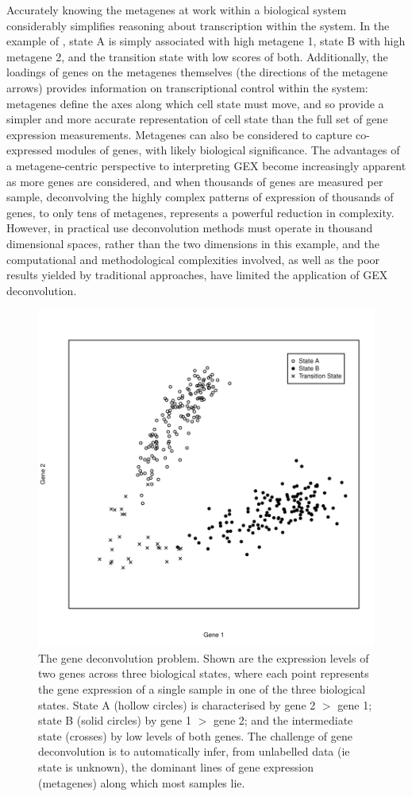 \documentclass[dissertation.tex]{subfiles}
\begin{document}
Accurately knowing the metagenes at work within a biological system considerably simplifies reasoning about transcription within the system.  In the example of , state A is simply associated with high metagene 1, state B with high metagene 2, and the transition state with low scores of both.  Additionally, the loadings of genes on the metagenes themselves (the directions of the metagene arrows) provides information on transcriptional control within the system: metagenes define the axes along which cell state must move, and so provide a simpler and more accurate representation of cell state than the full set of gene expression measurements.  Metagenes can also be considered to capture co-expressed modules of genes, with likely biological significance.  The advantages of a metagene-centric perspective to interpreting \gls{GEX} become increasingly apparent as more genes are considered, and when thousands of genes are measured per sample, deconvolving the highly complex patterns of expression of thousands of genes, to only tens of metagenes, represents a powerful reduction in complexity.  However, in practical use deconvolution methods must operate in thousand dimensional spaces, rather than the two dimensions in this example, and the computational and methodological complexities involved, as well as the poor results yielded by traditional approaches, have limited the application of \gls{GEX} deconvolution.

\begin{figure}
\centering
\includegraphics[width=.7\linewidth]{analysis/biosurv/reports/PCA_ICA_NMF_comparison/figure/plots-1}
\caption[Illustration of the gene deconvolution problem]{The gene deconvolution problem.  Shown are the expression levels of two genes across three biological states, where each point represents the gene expression of a single sample in one of the three biological states.  State A (hollow circles) is characterised by gene 2 $>$ gene 1; state B (solid circles) by gene 1 $>$ gene 2; and the intermediate state (crosses) by low levels of both genes.  The challenge of gene deconvolution is to automatically infer, from unlabelled data (ie state is unknown), the dominant lines of gene expression (metagenes) along which most samples lie.}\label{fig:sigs-example-matrixfactor-data}
\end{figure}
\end{document}
